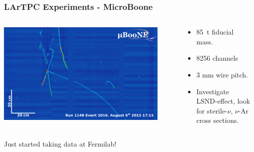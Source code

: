 \documentclass[xcolor=dvipsnames]{beamer}
\begin{document}
\begin{frame}
  \frametitle{LArTPC Experiments - MicroBoone}

  \begin{columns}
    \begin{column}{0.5\textwidth}
      \begin{center}
        \includegraphics[width=0.9\textwidth]{run1148_ev1016.png}
      \end{center}

    \end{column}
    \begin{column}{0.5\textwidth}
      \begin{itemize}
      \item \SI{85}{\tonne} fiducial mass.
      \item 8256 channels
      \item 3 mm wire pitch.
      \item Investigate LSND-effect, look for sterile-$\nu$, $\nu$-Ar
        cross sections.
      \end{itemize}
    \end{column}
  \end{columns}

  \begin{center}
    Just started taking data at Fermilab!    
  \end{center}

\end{frame}
\end{document}
